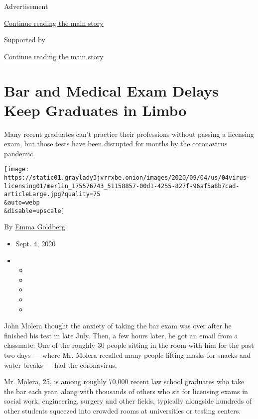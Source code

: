 Advertisement

\protect\hyperlink{after-top}{Continue reading the main story}

Supported by

\protect\hyperlink{after-sponsor}{Continue reading the main story}

\hypertarget{bar-and-medical-exam-delays-keep-graduates-in-limbo}{%
\section{Bar and Medical Exam Delays Keep Graduates in
Limbo}\label{bar-and-medical-exam-delays-keep-graduates-in-limbo}}

Many recent graduates can't practice their professions without passing a
licensing exam, but those tests have been disrupted for months by the
coronavirus pandemic.

\texttt{[image: https://static01.graylady3jvrrxbe.onion/images/2020/09/04/us/04virus-licensing01/merlin\_175576743\_51158857-00d1-4255-827f-96af5a8b7cad-articleLarge.jpg?quality=75\\\&auto=webp\\\&disable=upscale]}

By \href{https://www.nytimes3xbfgragh.onion/by/emma-goldberg}{Emma
Goldberg}

\begin{itemize}
\item
  Sept. 4, 2020
\item
  \begin{itemize}
  \item
  \item
  \item
  \item
  \item
  \end{itemize}
\end{itemize}

John Molera thought the anxiety of taking the bar exam was over after he
finished his test in late July. Then, a few hours later, he got an email
from a classmate: One of the roughly 30 people sitting in the room with
him for the past two days --- where Mr. Molera recalled many people
lifting masks for snacks and water breaks --- had the coronavirus.

Mr. Molera, 25, is among roughly 70,000 recent law school graduates who
take the bar each year, along with thousands of others who sit for
licensing exams in social work, engineering, surgery and other fields,
typically alongside hundreds of other students squeezed into crowded
rooms at universities or testing centers.

